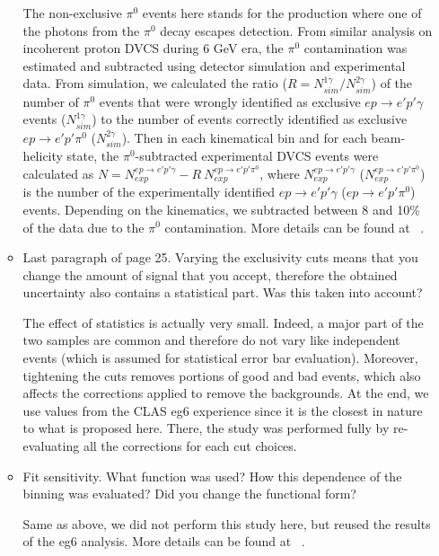 \begin{itemize}
\begin{itemize}
      {\color{red} The non-exclusive $\pi^0$ events here stands for the 
      production where one of the photons from the $\pi^0$ decay escapes 
      detection. From similar analysis on incoherent proton DVCS during 6 GeV 
      era, the $\pi^0$ contamination was estimated and subtracted using 
      detector simulation and experimental data. From simulation, we calculated 
      the ratio ($R = N^{1\gamma}_{sim}/N^{2\gamma}_{sim}$) of the number of 
      $\pi^0$ events that were wrongly identified as exclusive $ep\rightarrow 
      e'p'\gamma$ events ($N^{1\gamma}_{sim}$) to the number of events 
      correctly identified as exclusive $ep\rightarrow e'p'\pi^0$ 
      ($N^{2\gamma}_{sim}$).  Then in each kinematical bin and for each 
      beam-helicity state, the $\pi^0$-subtracted experimental DVCS events were 
      calculated as $N = N^{ep\rightarrow e'p'\gamma}_{exp}- R~N^{ep\rightarrow 
      e'p'\pi^0}_{exp}$, where $N^{ep\rightarrow e'p'\gamma}_{exp}$ 
      ($N^{ep\rightarrow e'p'\pi^0}_{exp}$) is the number of the experimentally 
      identified $ep\rightarrow e'p'\gamma$ ($ep\rightarrow e'p'\pi^0$) events.  
      Depending on the kinematics, we subtracted between 8 and 10\% of the data 
      due to the $\pi^0$ contamination. More details can be found at  
      ~\cite{eg6_note}. 

}

   
   \item Last paragraph of page 25. Varying the exclusivity cuts means that you 
      change the amount of signal that you accept, therefore the obtained 
      uncertainty also contains a statistical part. Was this taken into 
      account?


      {\color{red} The effect of statistics is actually very small. Indeed, a 
      major part of the two samples are common and therefore do not vary like 
      independent events (which is assumed for statistical error bar 
      evaluation).  Moreover, tightening the cuts removes portions of good and 
      bad events, which also affects the corrections applied to remove the 
      backgrounds. At the end, we use values from the CLAS eg6 experience since 
      it is the closest in nature to what is proposed here. There, the study 
      was performed fully by re-evaluating all the corrections for each cut 
      choices.}

 \item Fit sensitivity. What function was used? How this dependence of the 
    binning was evaluated? Did you change the functional form?

 {\color{red} Same as above, we did not perform this study here, but reused the 
      results of the eg6 analysis. More details can be found at  
      ~\cite{eg6_note}.  }

  \end{itemize}
  
  \end{itemize}
 

